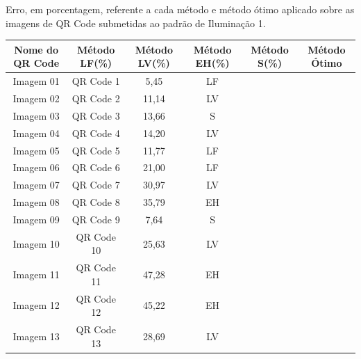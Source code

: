 \documentclass{ceel}
\begin{document}
\begin{multicols}{2}
\vspace{0.5cm}
\begin{minipage}[h]{\columnwidth}
\begin{scriptsize} 
\def\arraystretch{1.35}
\captionsetup{type=table}
\begin{center}
\caption{Erro, em porcentagem, referente a cada método e método ótimo aplicado sobre as imagens de QR Code submetidas ao padrão de Iluminação 1.} \label{tabP1} \vspace{-0.2cm}
\begin{tabular}{c c c c c c}\hline
\textbf{Nome do QR Code}&\textbf{Método LF(\%)}&\textbf{Método LV(\%)}&\textbf{Método EH(\%)}&\textbf{Método S(\%)}&\textbf{Método Ótimo} \\\hline
Imagem 01 & QR Code 1 & 5,45 & LF \\
Imagem 02 & QR Code 2 & 11,14 & LV \\
Imagem 03 & QR Code 3 & 13,66 & S \\
Imagem 04 & QR Code 4 & 14,20 & LV \\
Imagem 05 & QR Code 5 & 11,77 & LF \\
Imagem 06 & QR Code 6 & 21,00 & LF \\
Imagem 07 & QR Code 7 & 30,97 & LV \\
Imagem 08 & QR Code 8 & 35,79 & EH \\
Imagem 09 & QR Code 9 & 7,64 & S\\
Imagem 10 & QR Code 10 & 25,63 & LV \\
Imagem 11 & QR Code 11 & 47,28 & EH\\
Imagem 12 & QR Code 12 & 45,22 & EH \\
Imagem 13 & QR Code 13 & 28,69 & LV\\\hline
\end{tabular}
\end{center}
\end{scriptsize}
\end{minipage}


\end{multicols}
\end{document}
